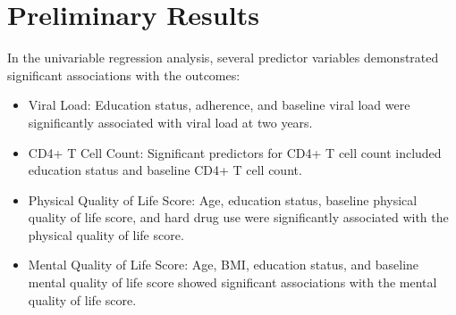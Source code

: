 \documentclass[
  12pt,
]{article}
\providecommand{\tightlist}{%
  \setlength{\itemsep}{0pt}\setlength{\parskip}{0pt}}
\begin{document}
\hypertarget{preliminary-results}{%
\section{Preliminary Results}\label{preliminary-results}}

In the univariable regression analysis, several predictor variables
demonstrated significant associations with the outcomes:

\begin{itemize}
\tightlist
\item
  Viral Load: Education status, adherence, and baseline viral load were
  significantly associated with viral load at two years.
\item
  CD4+ T Cell Count: Significant predictors for CD4+ T cell count
  included education status and baseline CD4+ T cell count.
\item
  Physical Quality of Life Score: Age, education status, baseline
  physical quality of life score, and hard drug use were significantly
  associated with the physical quality of life score.
\item
  Mental Quality of Life Score: Age, BMI, education status, and baseline
  mental quality of life score showed significant associations with the
  mental quality of life score.
\end{itemize}
\end{document}
